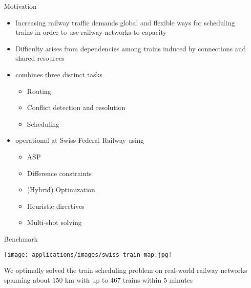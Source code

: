 \begin{frame}{Motivation}
  \begin{itemize}
  \item Increasing railway traffic demands global and flexible ways
    for scheduling trains in order to use railway networks to capacity
  \item Difficulty arises from dependencies among trains
    induced by connections and shared resources
    \pause
    \medskip
  \item {} combines three distinct tasks
    \begin{itemize}
    \item Routing
    \item Conflict detection and resolution
    \item Scheduling
    \end{itemize}
    \pause
    \smallskip
  \item {} operational at Swiss Federal Railway using 
    \begin{itemize}
    \item ASP
    \item Difference constraints
    \item (Hybrid) Optimization
    \item Heuristic directives
    \item Multi-shot solving
    \end{itemize}
  \end{itemize}
\end{frame}
\begin{frame}{Benchmark}
  \begin{center}
    \texttt{[image: applications/images/swiss-train-map.jpg]}
  \end{center}
  We optimally solved the train scheduling problem on real-world railway networks spanning about 150 km with up to 467 trains within 5 minutes
\end{frame}
%
